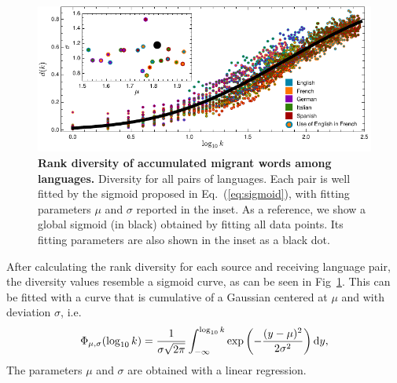 \documentclass[10pt,letterpaper]{article} %
\newcommand{\eref}[1]{Eq.~(\ref{#1})}
\begin{document}
\begin{figure} %
\centering
\includegraphics[scale=1]{images/Diversity.pdf}
\caption{{\bf Rank diversity of accumulated migrant words among languages.} 
Diversity for all pairs of languages. Each pair is well fitted by the 
sigmoid proposed in \eref{eq:sigmoid}, with fitting parameters $\mu$ and $\sigma$
reported in the inset. As a reference, we show a global sigmoid (in black)
obtained by fitting all data points. Its fitting parameters are also shown in the
inset as a black dot. 
% 
% 
% 
}
\label{fig.DR_art}
\end{figure} %
After calculating the rank diversity for each source and receiving
language pair, the diversity values resemble a sigmoid curve, as can be
seen in Fig~\ref{fig.DR_art}. This can be fitted with a curve that is
cumulative of a Gaussian centered at $\mu$ and with 
deviation $\sigma$, i.e.  
\begin{equation}
\Phi_{\mu,\sigma}(\log_{10} k)=\frac{1}{\sigma\sqrt{2\pi}}
   \int_{-\infty}^{\log_{10}k}\exp\left(-\frac{(y-\mu)^2}{2\sigma^2}\right) {\rm d} y,
   \label{eq:sigmoid}
\end{equation}
The parameters $\mu$ and $\sigma$
are obtained with a linear regression. 
\end{document}
